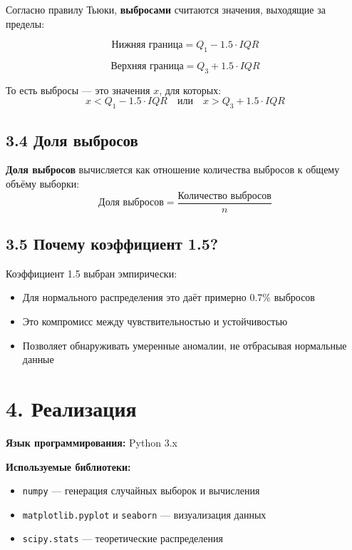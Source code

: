 \documentclass[a4paper,14pt]{extarticle}
\begin{document}
Согласно правилу Тьюки, \textbf{выбросами} считаются значения, выходящие за пределы:

\begin{equation}
\text{Нижняя граница} = Q_1 - 1.5 \cdot IQR
\end{equation}

\begin{equation}
\text{Верхняя граница} = Q_3 + 1.5 \cdot IQR
\end{equation}

То есть выбросы — это значения $x$, для которых:
\begin{equation}
x < Q_1 - 1.5 \cdot IQR \quad \text{или} \quad x > Q_3 + 1.5 \cdot IQR
\end{equation}

\subsection*{3.4 Доля выбросов}

\textbf{Доля выбросов} вычисляется как отношение количества выбросов к общему объёму выборки:
\begin{equation}
\text{Доля выбросов} = \frac{\text{Количество выбросов}}{n}
\end{equation}

\subsection*{3.5 Почему коэффициент 1.5?}

Коэффициент 1.5 выбран эмпирически:
\begin{itemize}
    \item Для нормального распределения это даёт примерно 0.7\% выбросов
    \item Это компромисс между чувствительностью и устойчивостью
    \item Позволяет обнаруживать умеренные аномалии, не отбрасывая нормальные данные
\end{itemize}

\section*{4. Реализация}

\textbf{Язык программирования:} Python 3.x

\textbf{Используемые библиотеки:}
\begin{itemize}
    \item \texttt{numpy} — генерация случайных выборок и вычисления
    \item \texttt{matplotlib.pyplot} и \texttt{seaborn} — визуализация данных
    \item \texttt{scipy.stats} — теоретические распределения
\end{itemize}
\end{document}
